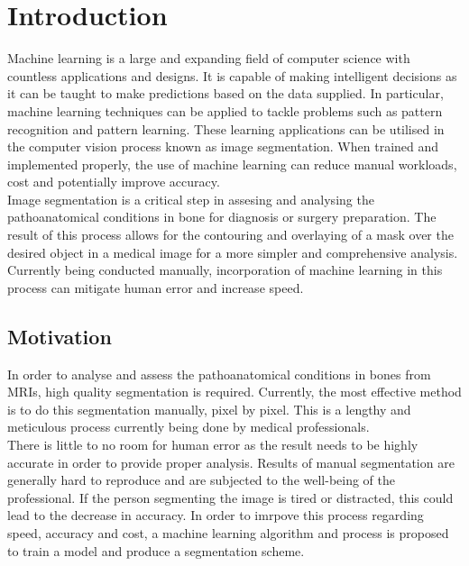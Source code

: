 \chapter{Introduction}
Machine learning is a large and expanding field of computer science with countless applications and designs. It is capable of making intelligent decisions as it can be taught to make predictions based on the data supplied. In particular, machine learning techniques can be applied to tackle problems such as pattern recognition and pattern learning. These learning applications can be utilised in the computer vision process known as image segmentation. When trained and implemented properly, the use of machine learning can reduce manual workloads, cost and potentially improve accuracy.
\\[1\baselineskip]
Image segmentation is a critical step in assesing and analysing the pathoanatomical conditions in bone for diagnosis or surgery preparation. The result of this process allows for the contouring and overlaying of a mask over the desired object in a medical image for a more simpler and comprehensive analysis. Currently being conducted manually, incorporation of machine learning in this process can mitigate human error and increase speed.

\section{Motivation}
In order to analyse and assess the pathoanatomical conditions in bones from MRIs, high quality segmentation is required. Currently, the most effective method is to do this segmentation manually, pixel by pixel. This is a lengthy and meticulous process currently being done by medical professionals.
\\[1\baselineskip]
There is little to no room for human error as the result needs to be highly accurate in order to provide proper analysis. Results of manual segmentation are generally hard to reproduce and are subjected to the well-being of the professional. If the person segmenting the image is tired or distracted, this could lead to the decrease in accuracy. In order to imrpove this process regarding speed, accuracy and cost, a machine learning algorithm and process is proposed to train a model and produce a segmentation scheme.